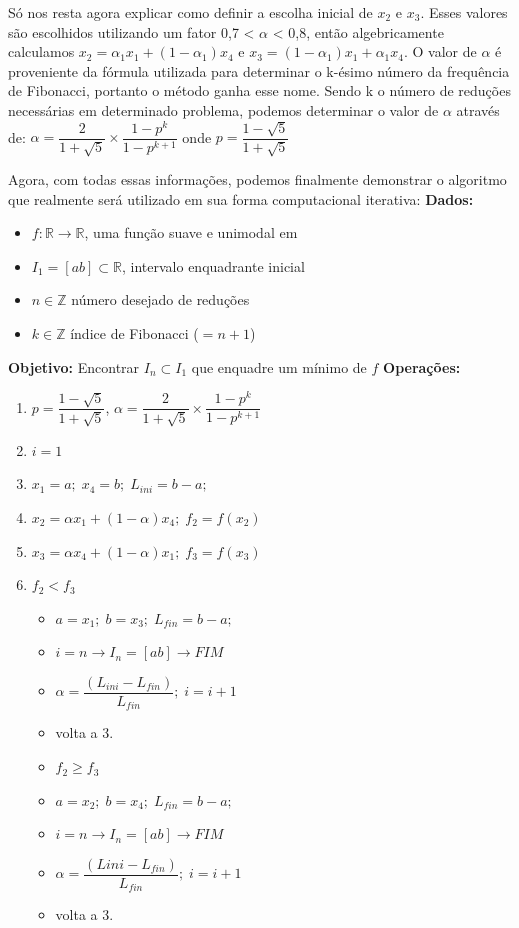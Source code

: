 Só nos resta agora explicar como definir a escolha inicial de $ x_2 $ e $ x_3 $. Esses valores são escolhidos utilizando um fator 0,7 < $\alpha$ < 0,8, então algebricamente calculamos $ x_2  =  \alpha_1  x_1  + (1 -  \alpha_1 ) x_4 $ e $ x_3  = (1 -  \alpha_1 ) x_1  +  \alpha_1  x_4 $.
O valor de $\alpha$ é proveniente da fórmula utilizada para determinar o k-ésimo número da frequência de Fibonacci, portanto o método ganha esse nome.
Sendo k o número de reduções necessárias em determinado problema, podemos determinar o valor de $\alpha$ através de:
$\alpha = \dfrac{2}{1+\sqrt{5}} \times \dfrac{1-p^k}{1-p^{k+1}}$ onde $p=\dfrac{1-\sqrt{5}}{1+\sqrt{5}}$

Agora, com todas essas informações, podemos finalmente demonstrar o algoritmo que realmente será utilizado em sua forma computacional iterativa:
\textbf{Dados:}
\begin{itemize}
	\item $f:\mathbb{R}\rightarrow\mathbb{R}$, uma função suave e unimodal em
	\item $I_1=[ab]\subset\mathbb{R}$, intervalo enquadrante inicial
	\item $n\in\mathbb{Z}$ número desejado de reduções
	\item $k\in\mathbb{Z}$ índice de Fibonacci ($=n+1$)
\end{itemize}
\textbf{Objetivo:} Encontrar $I_n \subset I_1$ que enquadre um mínimo de $f$
\textbf{Operações:}
\begin{enumerate}
	\item $p=\dfrac{1-\sqrt{5}}{1+\sqrt{5}}$, $\alpha = \dfrac{2}{1+\sqrt{5}} \times \dfrac{1-p^k}{1-p^{k+1}}$
	\item $i=1$
	\item $x_1=a;\; x_4=b;\; L_{ini}=b-a;$
	\item $x_2=\alpha x_1+(1-\alpha)x_4;\; f_2=f(x_2)$
	\item $x_3=\alpha x_4 + (1 - \alpha)x_1;\; f_3 = f(x_3)$
	\item $ f_2 < f_3 $
	
	\begin{itemize}
		\item $a=x_1;\; b=x_3;\; L_{fin}=b-a;$
		\item $i=n \rightarrow I_n = [ab] \rightarrow FIM$
		\item $\alpha = \dfrac{(L_{ini}-L_{fin})}{L_{fin}};\; i=i+1$
		\item volta a 3.
	\end{itemize}
	

	\begin{itemize}
		\item $f_2 \geq f_3$
		\item $a=x_2;\; b=x_4;\; L_{fin}=b-a;$
		\item $i=n \rightarrow I_n=[ab] \rightarrow FIM$
		\item $\alpha = \dfrac{(L{ini}-L_{fin})}{L_{fin}};\; i=i+1$
		\item volta a 3.
	\end{itemize}
\end{enumerate}

